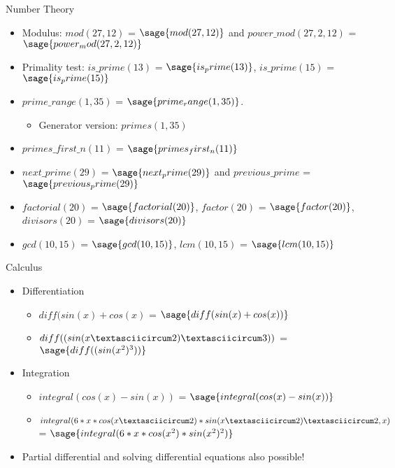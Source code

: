 \documentclass{beamer}
\begin{document}
\begin{frame}{Number Theory}
 \begin{itemize}
  \item Modulus: $mod(27, 12)$ = $\sage{mod(27, 12)}$ and $power \_ mod(27, 2, 12)$ = $\sage{power_mod(27, 2, 12)}$
  \item Primality test: $is \_ prime(13)$ = $\sage{is_prime(13)}$, $is \_ prime(15)$ = $\sage{is_prime(15)}$
  \item $prime \_ range(1, 35)$ = $\sage{prime_range(1, 35)}$.
  \begin{itemize}
    \item Generator version: $primes(1, 35)$
  \end{itemize}
  \item $primes \_ first \_ n(11)$ = $\sage{primes_first_n(11)}$
  \item $next \_ prime(29)$ = $\sage{next_prime(29)}$ and $previous \_ prime$ = $\sage{previous_prime(29)}$
  \item $factorial(20)$ = $\sage{factorial(20)}$, $factor(20)$ = $\sage{factor(20)}$, $divisors(20)$  = $\sage{divisors(20)}$
  \item $gcd(10, 15)$ = $\sage{gcd(10, 15)}$, $lcm(10, 15)$ = $\sage{lcm(10, 15)}$
 \end{itemize}
\end{frame}

\begin{frame}{Calculus}
  \begin{itemize}
    \item Differentiation
    \begin{itemize}
      \item $diff(sin(x) + cos(x)$ = $\sage{diff(sin(x) + cos(x))}$
      \item $diff((sin(x \textasciicircum 2) \textasciicircum 3))$ = $\sage{diff((sin(x^2)^3))}$
    \end{itemize}
    \item Integration
    \begin{itemize}
      \item $integral(cos(x) - sin(x))$ = $\sage{integral(cos(x) - sin(x))}$
      \item $integral(6*x*cos(x \textasciicircum 2)*sin(x \textasciicircum 2) \textasciicircum 2, x)$ = $\sage{integral(6*x*cos(x^2)*sin(x^2)^2)}$
    \end{itemize}
    \item Partial differential and solving differential equations also possible!
  \end{itemize}
\end{frame}
\end{document}
